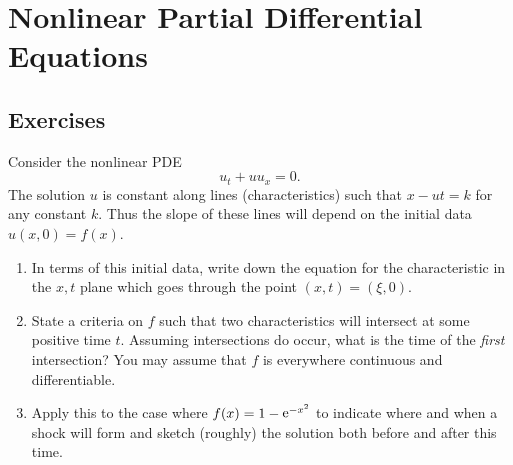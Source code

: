 \flushbottom






\chapter{Nonlinear Partial Differential Equations}












\raggedbottom
\pagebreak
\flushbottom
\section{Exercises}








\begin{Exercise}
  Consider the nonlinear PDE
  \[ 
  u_t + u u_x = 0.
  \]
  The solution $u$ is constant along lines 
  (characteristics) such that $x - u t = k$ for any constant $k$. Thus 
  the slope of these lines will depend on the initial data $u(x,0) = f(x)$. 
  \begin{enumerate} 
  \item 
    In terms of this initial data, write down the 
    equation for the characteristic in the $x,t$ plane which goes
    through the point $(x,t) = (\xi,0)$.
  \item 
    State a criteria on $f$ such that two characteristics will
    intersect at some positive time $t$. Assuming intersections do occur, 
    what is the time of the {\em first} intersection? 
    You may assume that $f$ is everywhere continuous and differentiable. 
  \item 
    Apply this to the case where $f(x) = 1 - \mathop{\mathrm{e}}\nolimits^{-x^2}$ to indicate 
    where and when a shock will form and sketch (roughly) the solution both 
    before and after this time. 
  \end{enumerate}
\end{Exercise}








